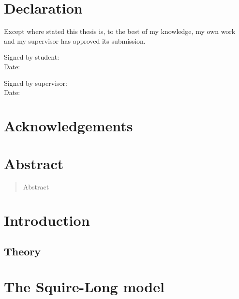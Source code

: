 \documentclass{X:/Documents/Coding/Latex/myreport}
\theoremstyle{plain}
\theoremstyle{definition}
\theoremstyle{remark}
\numberwithin{equation}{section}
\numberwithin{figure}{section}
\begin{document}
%
%

\chapter*{Declaration}

Except where stated this thesis is, to  the best of my knowledge,  my own work and my supervisor has approved its submission.

\vspace{20 pt}

\begin{flushleft}
Signed by student:  \\[15 pt]
Date:
\end{flushleft}

\vspace{20 pt}
\begin{flushleft}
Signed  by supervisor:\\[15 pt]
Date:
\end{flushleft}


\chapter*{Acknowledgements}

\chapter*{Abstract}

\begin{abstract}
	Abstract
\end{abstract}

\tableofcontents

%
%
\chapter{Introduction}


\section{Theory}
\theorem{}
\lemma

\chapter{The Squire-Long model}
\end{document}
